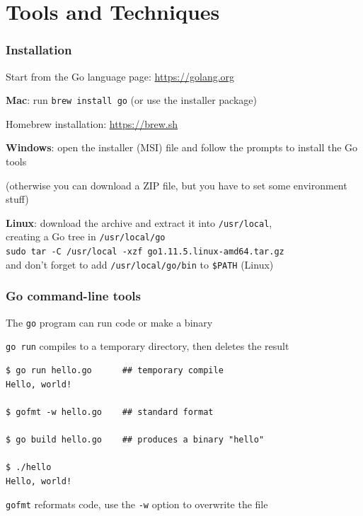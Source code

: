 \documentclass[handout,compress,t,11pt]{beamer}
\begin{document}
\section{Tools and Techniques}
\begin{frame}[fragile]
    \frametitle{Installation}
    Start from the Go language page: \href{https://golang.org}{https://golang.org} \par
    \vspace{0.5\baselineskip}
    {\bf Mac}: run \verb|brew install go| (or use the installer package) \par
    {\scriptsize Homebrew installation: \href{https://brew.sh}{https://brew.sh}} \par
    \vspace{0.75\baselineskip}
    {\bf Windows}: open the installer (MSI) file and follow the prompts to install the Go tools \par
    {\scriptsize(otherwise you can download a ZIP file, but you have to set some environment stuff)} \par
    \vspace{0.75\baselineskip}
    {\bf Linux}: download the archive and extract it into \verb|/usr/local|, \\
    creating a Go tree in \verb|/usr/local/go| \\
    \vspace{0.5\baselineskip}
    {\scriptsize\verb|sudo tar -C /usr/local -xzf go1.11.5.linux-amd64.tar.gz|} \\
    \vspace{0.5\baselineskip}
    and don't forget to add \verb|/usr/local/go/bin| to \verb|$PATH| (Linux)\\
\end{frame}

\begin{frame}[fragile]
    \frametitle{Go command-line tools}
    The \verb|go| program can run code or make a binary \par
    \vspace{0.5\baselineskip}
\verb|go run| compiles to a temporary directory, then deletes the result
    \vspace{0.25\baselineskip}
{\small\begin{verbatim}
$ go run hello.go      ## temporary compile
Hello, world!

$ gofmt -w hello.go    ## standard format

$ go build hello.go    ## produces a binary "hello"

$ ./hello
Hello, world!
\end{verbatim}}
    \vspace{0.5\baselineskip}
    \verb|gofmt| reformats code, use the \verb|-w| option to overwrite the file
\end{frame}
\end{document}
